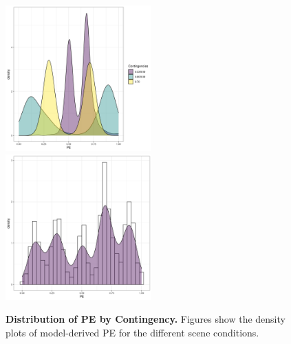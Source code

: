 \documentclass[a4paper,12pt]{article}
\begin{document}
\begin{figure}[ht!]
{\includegraphics[width=0.5\textwidth]{figures/PE_instr_distr.exp1.exp2.png}} \hfill
{\includegraphics[width=0.5\textwidth]{figures/PE_instr_distrNOscene.exp1.exp2.png}}
\caption{\textbf{Distribution of PE by Contingency.} Figures show the density plots of model-derived PE for the different scene conditions.  }
\label{fig:PE_distr}
\end{figure}
\end{document}
